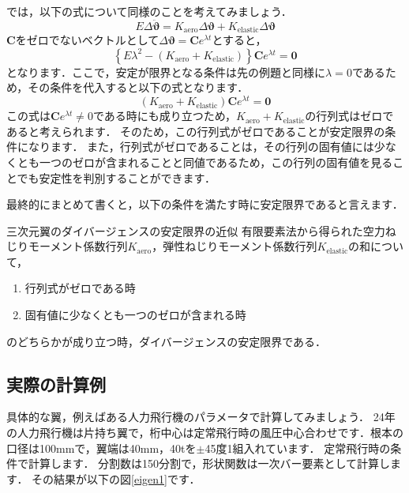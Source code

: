 \documentclass{jarticle}
\begin{document}
では，以下の式について同様のことを考えてみましょう．
\begin{equation}
    E\Delta\ddot{\bm{\vartheta}} = K_\mathrm{aero} \Delta\bm{\vartheta} + K_\mathrm{elastic} \Delta\bm{\vartheta}
\end{equation}
$\bm{C}$をゼロでないベクトルとして$\Delta\bm{\vartheta} = \bm{C}e^{\lambda t}$とすると，
\begin{equation}
    \left\{ E\lambda^2 - (K_\mathrm{aero} + K_\mathrm{elastic}) \right\}\bm{C}e^{\lambda t} = \bm{0}
\end{equation}
となります．ここで，安定が限界となる条件は先の例題と同様に$\lambda = 0$であるため，その条件を代入すると以下の式となります．
\begin{equation}
    (K_\mathrm{aero} + K_\mathrm{elastic})\bm{C}e^{\lambda t} = \bm{0}
\end{equation}
この式は$\bm{C}e^{\lambda t} \neq 0$である時にも成り立つため，$K_\mathrm{aero} + K_\mathrm{elastic}$の行列式はゼロであると考えられます．
そのため，この行列式がゼロであることが安定限界の条件になります．
また，行列式がゼロであることは，その行列の固有値には少なくとも一つのゼロが含まれることと同値であるため，この行列の固有値を見ることでも安定性を判別することができます．

最終的にまとめて書くと，以下の条件を満たす時に安定限界であると言えます．
\begin{itembox}[l]{三次元翼のダイバージェンスの安定限界の近似}
    有限要素法から得られた空力ねじりモーメント係数行列$K_\mathrm{aero}$，弾性ねじりモーメント係数行列$K_\mathrm{elastic}$の和について，
    \begin{enumerate}
        \item 行列式がゼロである時
        \item 固有値に少なくとも一つのゼロが含まれる時
    \end{enumerate}
    のどちらかが成り立つ時，ダイバージェンスの安定限界である．
\end{itembox}


\subsection{実際の計算例}

具体的な翼，例えばある人力飛行機のパラメータで計算してみましょう．
24年の人力飛行機は片持ち翼で，桁中心は定常飛行時の風圧中心合わせです．根本の口径は100mmで，翼端は40mm，40tを$\pm$45度1組入れています．
定常飛行時の条件で計算します．
分割数は150分割で，形状関数は一次バー要素として計算します．
その結果が以下の図\ref{eigen1}です．
\end{document}
